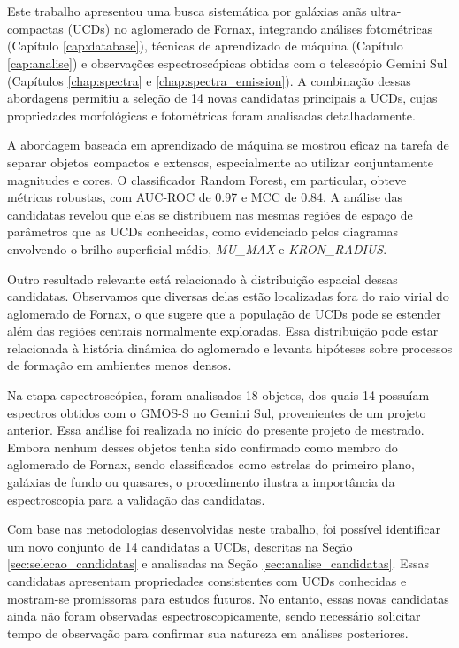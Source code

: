 \chapter{\chapternameconclusions}\label{chap:conclusions}

Este trabalho apresentou uma busca sistemática por galáxias anãs ultra-compactas (UCDs) no aglomerado de Fornax, integrando análises fotométricas (Capítulo \ref{cap:database}), técnicas de aprendizado de máquina (Capítulo \ref{cap:analise}) e observações espectroscópicas obtidas com o telescópio Gemini Sul (Capítulos \ref{chap:spectra} e \ref{chap:spectra_emission}). A combinação dessas abordagens permitiu a seleção de 14 novas candidatas principais a UCDs, cujas propriedades morfológicas e fotométricas foram analisadas detalhadamente.

A abordagem baseada em aprendizado de máquina se mostrou eficaz na tarefa de separar objetos compactos e extensos, especialmente ao utilizar conjuntamente magnitudes e cores. O classificador Random Forest, em particular, obteve métricas robustas, com AUC-ROC de 0.97 e MCC de 0.84. A análise das candidatas revelou que elas se distribuem nas mesmas regiões de espaço de parâmetros que as UCDs conhecidas, como evidenciado pelos diagramas envolvendo o brilho superficial médio, \textit{MU\_MAX} e \textit{KRON\_RADIUS}.

Outro resultado relevante está relacionado à distribuição espacial dessas candidatas. Observamos que diversas delas estão localizadas fora do raio virial do aglomerado de Fornax, o que sugere que a população de UCDs pode se estender além das regiões centrais normalmente exploradas. Essa distribuição pode estar relacionada à história dinâmica do aglomerado e levanta hipóteses sobre processos de formação em ambientes menos densos.

Na etapa espectroscópica, foram analisados 18 objetos, dos quais 14 possuíam espectros obtidos com o GMOS-S no Gemini Sul, provenientes de um projeto anterior. Essa análise foi realizada no início do presente projeto de mestrado. Embora nenhum desses objetos tenha sido confirmado como membro do aglomerado de Fornax, sendo classificados como estrelas do primeiro plano, galáxias de fundo ou quasares, o procedimento ilustra a importância da espectroscopia para a validação das candidatas.

Com base nas metodologias desenvolvidas neste trabalho, foi possível identificar um novo conjunto de 14 candidatas a UCDs, descritas na Seção \ref{sec:selecao_candidatas} e analisadas na Seção \ref{sec:analise_candidatas}. Essas candidatas apresentam propriedades consistentes com UCDs conhecidas e mostram-se promissoras para estudos futuros. No entanto, essas novas candidatas ainda não foram observadas espectroscopicamente, sendo necessário solicitar tempo de observação para confirmar sua natureza em análises posteriores.

